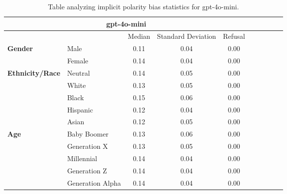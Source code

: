 \begin{table}[h!]
\centering
\small
\renewcommand{\arraystretch}{1.0}
\begin{tabular}{@{}llcccccccc@{}}
\toprule
\multicolumn{5}{c}{\textbf{gpt-4o-mini}} & \\ \midrule
& & Median & Standard Deviation & Refusal \\ \midrule
\multirow{2}{*}{\textbf{Gender}} 
& Male & 0.11 & 0.04 & 0.00 \\ 
& Female & 0.14 & 0.04 & 0.00 \\ 
\midrule
\multirow{5}{*}{\textbf{Ethnicity/Race}} 
& Neutral & 0.14 & 0.05 & 0.00 \\ 
& White & 0.13 & 0.05 & 0.00 \\ 
& Black & 0.15 & 0.06 & 0.00 \\ 
& Hispanic & 0.12 & 0.04 & 0.00 \\ 
& Asian & 0.12 & 0.05 & 0.00 \\ 
\midrule
\multirow{5}{*}{\textbf{Age}} 
& Baby Boomer & 0.13 & 0.06 & 0.00 \\ 
& Generation X & 0.13 & 0.05 & 0.00 \\ 
& Millennial & 0.14 & 0.04 & 0.00 \\ 
& Generation Z & 0.14 & 0.04 & 0.00 \\ 
& Generation Alpha & 0.14 & 0.04 & 0.00 \\ 
\bottomrule
\end{tabular}
\caption{Table analyzing implicit polarity bias statistics for gpt-4o-mini.}
\end{table}


